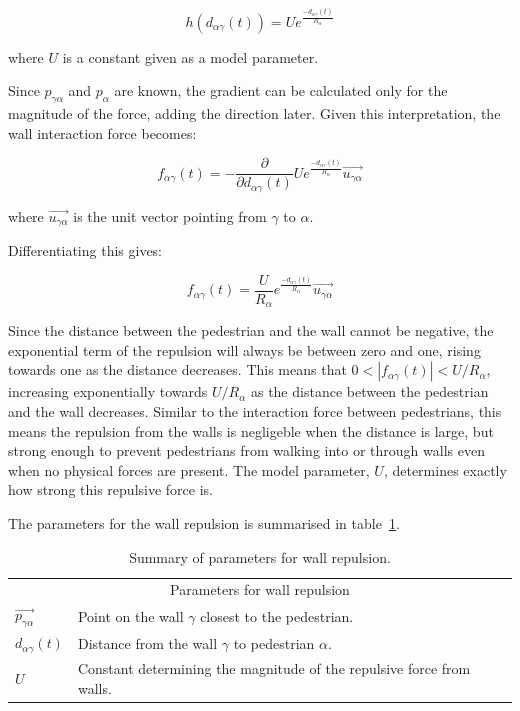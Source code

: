 \begin{equation}
    h \left( d_{\alpha \gamma}(t) \right) =
    U e^{\frac{- d_{\alpha \gamma}(t) }{ R_{\alpha} }}
\end{equation}

where $U$ is a constant given as a model parameter.

Since $p_{\gamma \alpha}$ and $p_\alpha$ are known, the gradient can be
calculated only for the magnitude of the force, adding the direction later.
Given this interpretation, the wall interaction force becomes:


\begin{equation}
    f_{\alpha \gamma}(t) =
    -\frac{\partial}{\partial d_{\alpha \gamma}(t)}U e^{\frac{- d_{\alpha
    \gamma}(t) }{ R_{\alpha} }} \overrightarrow{u_{\gamma \alpha}}
\end{equation}

where $\overrightarrow{u_{\gamma \alpha}}$ is the unit vector pointing from
$\gamma$ to $\alpha$.

Differentiating this gives:

\begin{equation}
    f_{\alpha \gamma}(t) =
    \frac{U}{R_\alpha}
    e^{\frac{- d_{\alpha \gamma}(t) }{ R_{\alpha} }}
    \overrightarrow{u_{\gamma \alpha}}
    \label{eqn:wall-repulsion}
\end{equation}

Since the distance between the pedestrian and the wall cannot be negative, the
exponential term of the repulsion will always be between zero and one, rising
towards one as the distance decreases. This means that $0 < |f_{\alpha
\gamma}(t)| < U/R_\alpha$, increasing exponentially towards $U/R_\alpha$ as
the distance between the pedestrian and the wall decreases. Similar to the
interaction force between pedestrians, this means the repulsion from the walls
is negligeble when the distance is large, but strong enough to prevent
pedestrians from walking into or through walls even when no physical forces
are present. The model parameter, $U$, determines exactly how strong this
repulsive force is.

The parameters for the wall repulsion is summarised in
table~\ref{tbl:wall-repulsion}.

\begin{table}[h]
    \centering
    \begin{tabular}{l l}
        \toprule
        \multicolumn{2}{c}{\textsf{Parameters for wall repulsion}}\\
        $\overrightarrow{p_{\gamma \alpha}}$ & Point on the wall $\gamma$ closest to
        the pedestrian.\\
        $d_{\alpha \gamma}(t)$ & Distance from the wall $\gamma$ to pedestrian
        $\alpha$. \\
        $U$ & Constant determining the magnitude of the repulsive force from
        walls. \\
        \bottomrule
    \end{tabular}
    \caption{Summary of parameters for wall repulsion.}
    \label{tbl:wall-repulsion}
\end{table}

